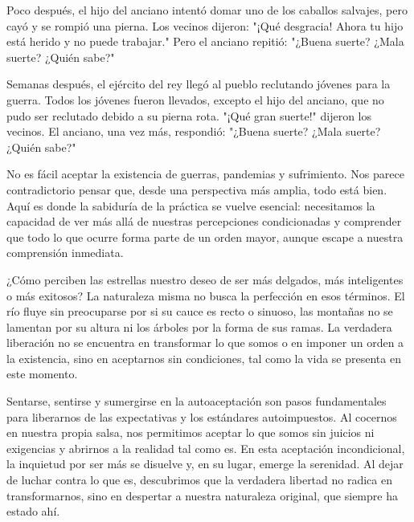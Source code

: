 \documentclass[
  a5paperpaper,
]{article}
\begin{document}
Poco después, el hijo del anciano intentó domar uno de los caballos
salvajes, pero cayó y se rompió una pierna. Los vecinos dijeron: "¡Qué
desgracia! Ahora tu hijo está herido y no puede trabajar." Pero el
anciano repitió: "¿Buena suerte? ¿Mala suerte? ¿Quién sabe?"

Semanas después, el ejército del rey llegó al pueblo reclutando jóvenes
para la guerra. Todos los jóvenes fueron llevados, excepto el hijo del
anciano, que no pudo ser reclutado debido a su pierna rota. "¡Qué gran
suerte!" dijeron los vecinos. El anciano, una vez más, respondió:
"¿Buena suerte? ¿Mala suerte? ¿Quién sabe?"

No es fácil aceptar la existencia de guerras, pandemias y sufrimiento.
Nos parece contradictorio pensar que, desde una perspectiva más amplia,
todo está bien. Aquí es donde la sabiduría de la práctica se vuelve
esencial: necesitamos la capacidad de ver más allá de nuestras
percepciones condicionadas y comprender que todo lo que ocurre forma
parte de un orden mayor, aunque escape a nuestra comprensión inmediata.

¿Cómo perciben las estrellas nuestro deseo de ser más delgados, más
inteligentes o más exitosos? La naturaleza misma no busca la perfección
en esos términos. El río fluye sin preocuparse por si su cauce es recto
o sinuoso, las montañas no se lamentan por su altura ni los árboles por
la forma de sus ramas. La verdadera liberación no se encuentra en
transformar lo que somos o en imponer un orden a la existencia, sino en
aceptarnos sin condiciones, tal como la vida se presenta en este
momento.

Sentarse, sentirse y sumergirse en la autoaceptación son pasos
fundamentales para liberarnos de las expectativas y los estándares
autoimpuestos. Al cocernos en nuestra propia salsa, nos permitimos
aceptar lo que somos sin juicios ni exigencias y abrirnos a la realidad
tal como es. En esta aceptación incondicional, la inquietud por ser más
se disuelve y, en su lugar, emerge la serenidad. Al dejar de luchar
contra lo que es, descubrimos que la verdadera libertad no radica en
transformarnos, sino en despertar a nuestra naturaleza original, que
siempre ha estado ahí.

\hfill\break

\hfill\break
\end{document}
